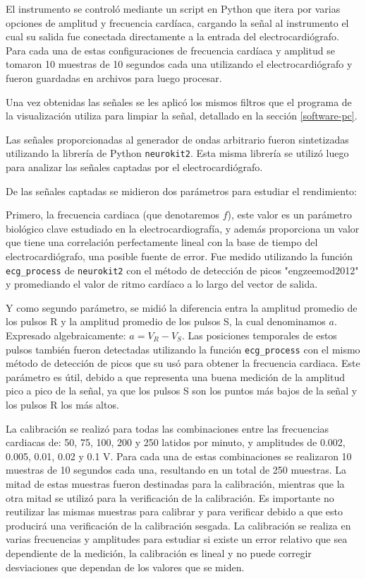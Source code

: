 \documentclass[conference]{IEEEtran}
\begin{document}
El instrumento se controló mediante un script en Python que itera por varias
opciones de amplitud y frecuencia cardíaca, cargando la señal al instrumento el
cual su salida fue conectada directamente a la entrada del electrocardiógrafo.
Para cada una de estas configuraciones de frecuencia cardíaca y amplitud se
tomaron 10 muestras de 10 segundos cada una utilizando el electrocardiógrafo y
fueron guardadas en archivos para luego procesar.

Una vez obtenidas las señales se les aplicó los mismos filtros que el programa
de la visualización utiliza para limpiar la señal, detallado en la sección
\ref{software-pc}.

Las señales proporcionadas al generador de ondas arbitrario fueron sintetizadas 
utilizando la librería de Python \texttt{neurokit2}. \cite{neurokit2} Esta misma
librería se utilizó luego para analizar las señales captadas por el
electrocardiógrafo.

De las señales captadas se midieron dos parámetros para estudiar el rendimiento:

Primero, la frecuencia cardiaca (que denotaremos $f$), este valor es un
parámetro biológico clave estudiado en la electrocardiografía, y además
proporciona un valor que tiene una correlación perfectamente lineal con la base
de tiempo del electrocardiógrafo, una posible fuente de error. Fue medido
utilizando la función \texttt{ecg\_process} de \texttt{neurokit2} con  el método
de detección de picos "engzeemod2012" y promediando el valor de ritmo
cardíaco a lo largo del vector de salida.

Y como segundo parámetro, se midió la diferencia entra la amplitud promedio de
los pulsos R y la amplitud promedio de los pulsos S, la cual denominamos $a$.
Expresado algebraicamente: $a = V_R - V_S$.
Las posiciones temporales de estos pulsos también fueron detectadas
utilizando la función \texttt{ecg\_process} con el mismo método de detección de
picos que su usó para obtener la frecuencia cardiaca. Este parámetro es útil,
debido a que representa una buena medición de la amplitud pico a pico de la
señal, ya que los pulsos S son los puntos más bajos de la señal y los pulsos R
los más altos.

La calibración se realizó para todas las combinaciones entre las frecuencias
cardiacas de: 50, 75, 100, 200 y 250 latidos por minuto, y amplitudes de 0.002,
0.005, 0.01, 0.02 y 0.1 V. 
Para cada una de estas combinaciones se realizaron 10 muestras de 10 segundos
cada una, resultando en un total de 250 muestras. La mitad de estas muestras
fueron destinadas para la calibración, mientras que la otra mitad se utilizó
para la verificación de la calibración. Es importante no reutilizar las mismas
muestras para calibrar y para verificar debido a que esto producirá una
verificación de la calibración sesgada. La calibración se realiza en varias
frecuencias y amplitudes para estudiar si existe un error relativo que sea
dependiente de la medición, la calibración es lineal y no puede corregir
desviaciones que dependan de los valores que se miden.
\end{document}

